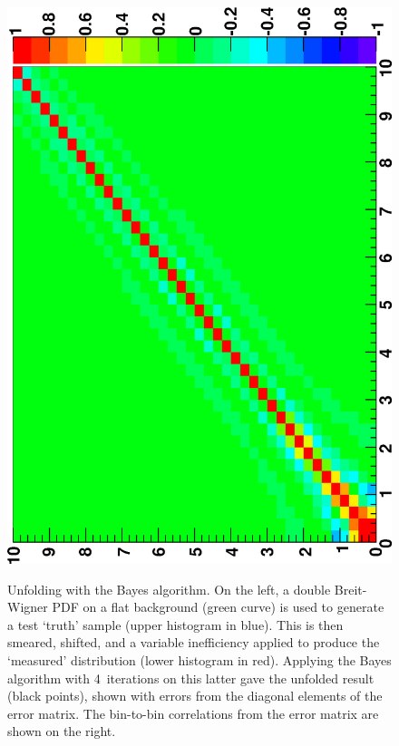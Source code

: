 \documentclass{cernrep}
\begin{document}
\begin{figure}
{                     \includegraphics[angle=-90,width=.338\textwidth,clip]{phystat2011_adye_bayes2.eps}}%
\caption{Unfolding with the Bayes algorithm.
On the left, a double Breit-Wigner PDF on a flat background (green curve) is used to generate
a test `truth' sample (upper histogram in blue). 
This is then smeared, shifted, and a variable inefficiency applied to produce
the `measured' distribution (lower histogram in red).
Applying the Bayes algorithm with 4~iterations on this latter gave the unfolded result
(black points), shown with errors from the diagonal elements of the error matrix.
The bin-to-bin correlations from the error matrix are shown on the right.
}\label{Fig:adye:bayes-example}
\end{figure}%
\end{document}
